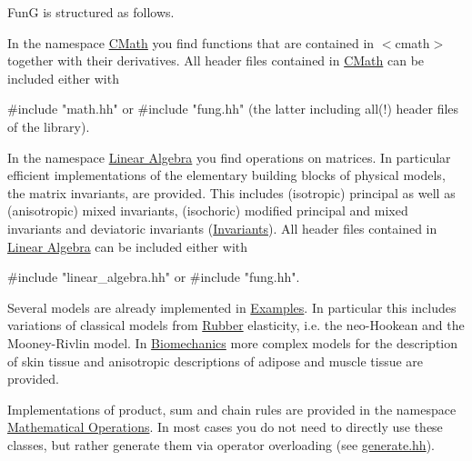 Fun\-G is structured as follows.


\begin{DoxyItemize}
\item In the namespace \hyperlink{group__CMathGroup}{C\-Math} you find functions that are contained in {\ttfamily $<$cmath$>$} together with their derivatives. All header files contained in \hyperlink{group__CMathGroup}{C\-Math} can be included either with 
\begin{DoxyPre}{\ttfamily #include "math.hh"} or {\ttfamily #include "fung.hh"} (the latter including all(!) header files of the library).\end{DoxyPre}

\item In the namespace \hyperlink{group__LinearAlgebraGroup}{Linear Algebra} you find operations on matrices. In particular efficient implementations of the elementary building blocks of physical models, the matrix invariants, are provided. This includes (isotropic) principal as well as (anisotropic) mixed invariants, (isochoric) modified principal and mixed invariants and deviatoric invariants (\hyperlink{group__InvariantGroup}{Invariants}). All header files contained in \hyperlink{group__LinearAlgebraGroup}{Linear Algebra} can be included either with 
\begin{DoxyPre}{\ttfamily #include "linear\_algebra.hh"} or {\ttfamily #include "fung.hh"}.\end{DoxyPre}

\item Several models are already implemented in \hyperlink{group__Examples}{Examples}. In particular this includes variations of classical models from \hyperlink{group__Rubber}{Rubber} elasticity, i.\-e. the neo-\/\-Hookean and the Mooney-\/\-Rivlin model. In \hyperlink{group__Biomechanics}{Biomechanics} more complex models for the description of skin tissue and anisotropic descriptions of adipose and muscle tissue are provided.
\item Implementations of product, sum and chain rules are provided in the namespace \hyperlink{group__MathematicalOperationsGroup}{Mathematical Operations}. In most cases you do not need to directly use these classes, but rather generate them via operator overloading (see \hyperlink{generate_8hh_source}{generate.\-hh}). 
\end{DoxyItemize}